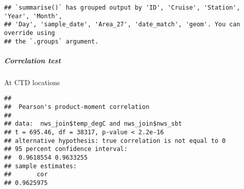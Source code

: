 \documentclass[
]{article}
\newenvironment{Shaded}{\begin{snugshade}}{\end{snugshade}}
\newcommand{\AttributeTok}[1]{\textcolor[rgb]{0.77,0.63,0.00}{#1}}
\newcommand{\CommentTok}[1]{\textcolor[rgb]{0.56,0.35,0.01}{\textit{#1}}}
\newcommand{\FunctionTok}[1]{\textcolor[rgb]{0.00,0.00,0.00}{#1}}
\newcommand{\NormalTok}[1]{#1}
\newcommand{\OtherTok}[1]{\textcolor[rgb]{0.56,0.35,0.01}{#1}}
\newcommand{\SpecialCharTok}[1]{\textcolor[rgb]{0.00,0.00,0.00}{#1}}
\begin{document}
\begin{Shaded}
\end{Shaded}

\begin{verbatim}
## `summarise()` has grouped output by 'ID', 'Cruise', 'Station', 'Year', 'Month',
## 'Day', 'sample_date', 'Area_27', 'date_match', 'geom'. You can override using
## the `.groups` argument.
\end{verbatim}

\hypertarget{correlation-test-2}{%
\subparagraph{Correlation test}\label{correlation-test-2}}

At CTD locations

\begin{Shaded}
\end{Shaded}

\begin{verbatim}
## 
##  Pearson's product-moment correlation
## 
## data:  nws_join$temp_degC and nws_join$nws_sbt
## t = 695.46, df = 38317, p-value < 2.2e-16
## alternative hypothesis: true correlation is not equal to 0
## 95 percent confidence interval:
##  0.9618554 0.9633255
## sample estimates:
##       cor 
## 0.9625975
\end{verbatim}
\end{document}
